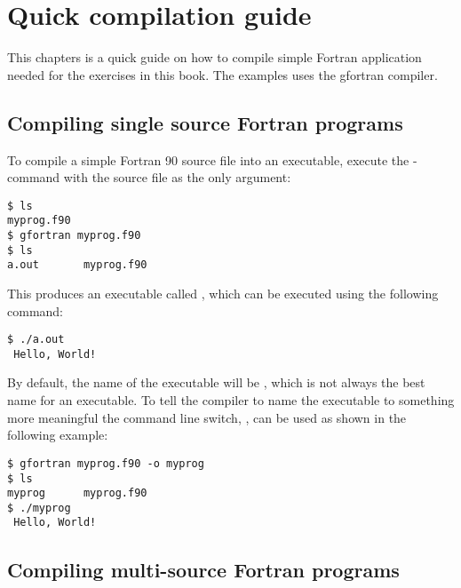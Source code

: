 \chapter{Quick compilation guide} \label{app:compiling_fortran}

This chapters is a quick guide on how to compile simple Fortran application needed for the exercises in this book. The examples uses the gfortran compiler.

\section{Compiling single source Fortran programs}

To compile a simple Fortran 90 source file into an executable, execute the -command with the source file as the only argument:

\cmdmode

\begin{lstlisting}
$ ls
myprog.f90
$ gfortran myprog.f90 
$ ls
a.out		myprog.f90
\end{lstlisting}

This produces an executable called , which can be executed using the following command:

\begin{lstlisting}
$ ./a.out 
 Hello, World!
\end{lstlisting}

By default, the name of the executable will be , which is not always the best name for an executable. To tell the compiler to name the executable to something more meaningful the command line switch, , can be used as shown in the following example:

\begin{lstlisting}
$ gfortran myprog.f90 -o myprog
$ ls
myprog		myprog.f90
$ ./myprog 
 Hello, World!
\end{lstlisting}

\section{Compiling multi-source Fortran programs}

